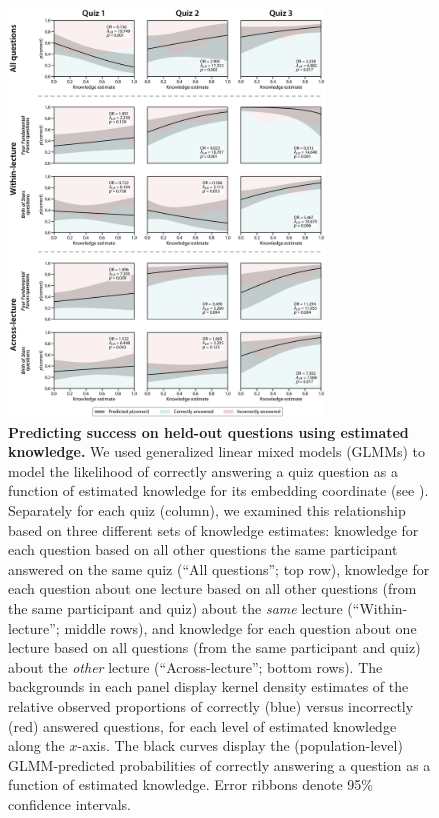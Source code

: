 \documentclass[10pt]{article}
\renewcommand{\nameref}[1]{\mbox{\textit{\oldnameref{#1}}}}
\begin{document}
\begin{figure}[tp]
    \centering

    \includegraphics[width=0.75\textwidth]{figs/predict-knowledge-questions}
    \caption{\textbf{Predicting success on held-out questions using estimated
    knowledge.} We used generalized linear mixed models (GLMMs) to model the
    likelihood of correctly answering a quiz question as a function of
    estimated knowledge for its embedding coordinate (see
    \nameref{subsec:glmm}). Separately for each quiz (column), we examined this
    relationship based on three different sets of knowledge estimates:
    knowledge for each question based on all other questions the same
    participant answered on the same quiz (``All questions''; top row),
    knowledge for each question about one lecture based on all other questions
    (from the same participant and quiz) about the \textit{same} lecture
    (``Within-lecture''; middle rows), and knowledge for each question about
    one lecture based on all questions (from the same participant and quiz)
    about the \textit{other} lecture (``Across-lecture''; bottom rows). The
    backgrounds in each panel display kernel density estimates of the relative
    observed proportions of correctly (blue) versus incorrectly (red) answered
    questions, for each level of estimated knowledge along the $x$-axis. The
    black curves display the (population-level) GLMM-predicted probabilities of
    correctly answering a question as a function of estimated knowledge. Error
    ribbons denote 95\% confidence intervals.}

    \label{fig:predictions}
\end{figure}
\end{document}
